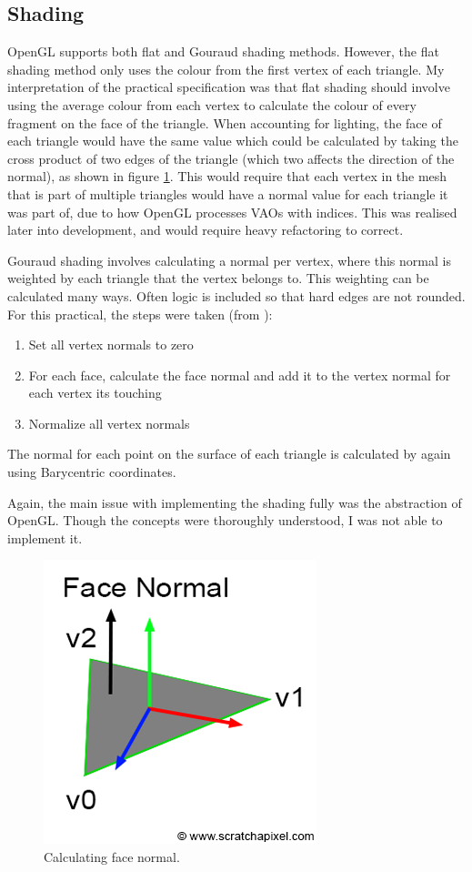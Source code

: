 \documentclass[12pt]{article}
\begin{document}
\subsection{Shading}

OpenGL supports both flat and Gouraud shading methods. 
However, the flat shading method only uses the colour from the first vertex of each triangle.
My interpretation of the practical specification was that flat shading should involve using the average colour from each vertex to calculate the colour of every fragment on the face of the triangle.
When accounting for lighting, the face of each triangle would have the same value which could be calculated by taking the cross product of two edges of the triangle (which two affects the direction of the normal), as shown in figure \ref{fig:tri_normal}. 
This would require that each vertex in the mesh that is part of multiple triangles would have a normal value for each triangle it was part of, due to how OpenGL processes VAOs with indices.
This was realised later into development, and would require heavy refactoring to correct. 

Gouraud shading involves calculating a normal per vertex, where this normal is weighted by each triangle that the vertex belongs to.
This weighting can be calculated many ways.
Often logic is included so that hard edges are not rounded.
For this practical, the steps were taken (from \cite{gouraud}):

\begin{enumerate}
\itemsep0em
\item Set all vertex normals to zero
\item For each face, calculate the face normal and add it to the vertex normal for each vertex its touching
\item Normalize all vertex normals
\end{enumerate}

The normal for each point on the surface of each triangle is calculated by again using Barycentric coordinates.

Again, the main issue with implementing the shading fully was the abstraction of OpenGL.
Though the concepts were thoroughly understood, I was not able to implement it.

\begin{figure}[!ht]
	\centering
	\includegraphics[width=0.4\linewidth]{images/tri-normal.png}
    \caption{Calculating face normal.}
	\label{fig:tri_normal}
\end{figure}
\end{document}

